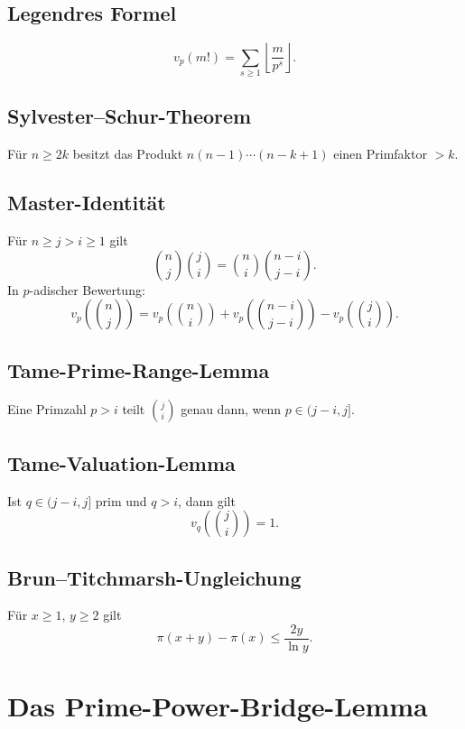 \documentclass[12pt,a4paper]{article}
\theoremstyle{plain}
\theoremstyle{definition}
\theoremstyle{remark}
\begin{document}
	\subsection{Legendres Formel}
	\[
	v_p(m!) = \sum_{s \geq 1} \left\lfloor \frac{m}{p^s} \right\rfloor.
	\]
	
	\subsection{Sylvester--Schur-Theorem}
	Für $n \geq 2k$ besitzt das Produkt $n(n-1)\cdots(n-k+1)$ einen Primfaktor $> k$.
	
	\subsection{Master-Identität}
	Für $n \geq j > i \geq 1$ gilt
	\begin{equation}\tag{$\star$}\label{eq:master}
		\binom{n}{j}\binom{j}{i}
		=
		\binom{n}{i}\binom{n-i}{j-i}.
	\end{equation}
	In $p$-adischer Bewertung:
	\begin{equation}\tag{$\star\star$}\label{eq:master-vp}
		v_p\!\left(\binom{n}{j}\right)
		=
		v_p\!\left(\binom{n}{i}\right)
		+
		v_p\!\left(\binom{n-i}{j-i}\right)
		-
		v_p\!\left(\binom{j}{i}\right).
	\end{equation}
	
	\subsection{Tame-Prime-Range-Lemma}
	Eine Primzahl $p > i$ teilt $\binom{j}{i}$ genau dann, wenn $p \in (j-i,j]$.
	
	\subsection{Tame-Valuation-Lemma}
	Ist $q \in (j-i,j]$ prim und $q > i$, dann gilt
	\[
	v_q\!\left(\binom{j}{i}\right) = 1.
	\]
	
	\subsection{Brun--Titchmarsh-Ungleichung}
	Für $x \geq 1$, $y \geq 2$ gilt
	\[
	\pi(x+y) - \pi(x) \leq \frac{2y}{\ln y}.
	\]
	
	\section{Das Prime-Power-Bridge-Lemma}
	
\end{document}
